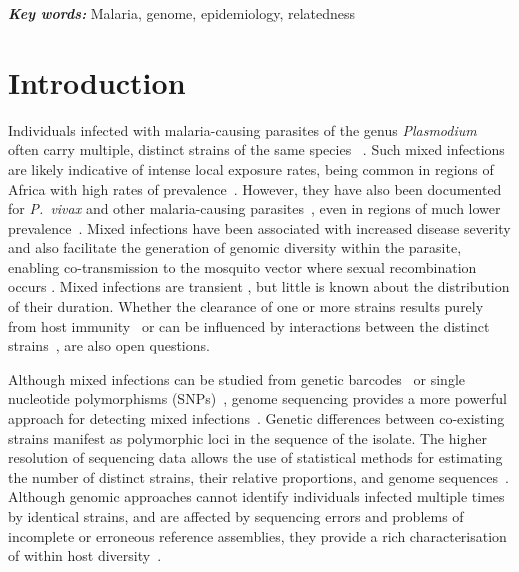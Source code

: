 \documentclass[9pt,lineno]{elife}
\providecommand{\keywords}[1]{\textbf{\textit{Key words:}} #1}
\begin{document}
\keywords{Malaria, genome, epidemiology, relatedness}


\section{Introduction}


Individuals infected with malaria-causing parasites of the genus {\it Plasmodium} often carry multiple, distinct strains of the same species ~\citep{Bell2006}.  Such mixed infections are likely indicative of intense local exposure rates, being common in regions of Africa with high rates of prevalence~\citep{Bhatt2015, Howes2016}. However, they have also been documented for {\it P.~vivax} and other malaria-causing parasites~\citep{Mueller2007, Collins2012}, even in regions of much lower prevalence~\citep{Howes2016, Steenkeste2010}.  Mixed infections have been associated with increased disease severity \citep{deRoode2005} and also facilitate the generation of genomic diversity within the parasite, enabling co-transmission to the mosquito vector where sexual recombination occurs \citep{Mzilahowa2007}.  Mixed infections are transient \citep{Bruce2002, Zimmerman2004}, but little is known about the distribution of their duration. Whether the clearance of one or more strains results purely from host immunity~\citep{Borrmann2011} or can be influenced by interactions between the distinct strains~\citep{Enosse2006, Bushman2016}, are also open questions.

Although mixed infections can be studied from genetic barcodes~\citep{Galinsky2015} or single nucleotide polymorphisms (SNPs)~\citep{Jack2016}, genome sequencing provides a more powerful approach for detecting mixed infections~\citep{Chang2017}.  Genetic differences between co-existing strains manifest as polymorphic loci in the sequence of the isolate. The higher resolution of sequencing data allows the use of statistical methods for estimating the number of distinct strains, their relative proportions, and genome sequences~\citep{Zhu2017}.  Although genomic approaches cannot identify individuals infected multiple times by identical strains, and are affected by sequencing errors and problems of incomplete or erroneous reference assemblies, they provide a rich characterisation of within host diversity~\citep{Manske2012}.
\end{document}
